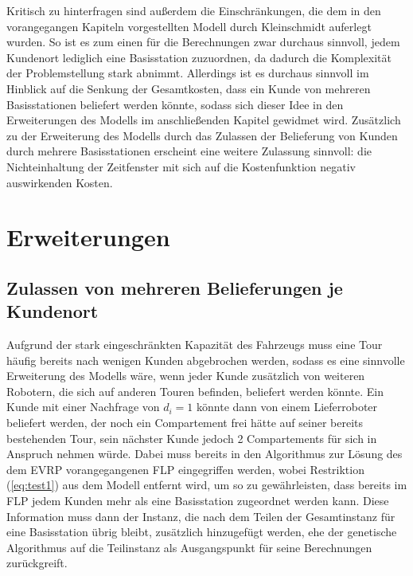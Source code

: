 \documentclass[a4paper,12pt,parskip,bibtotoc,liststotoc]{article}
\begin{document}
Kritisch zu hinterfragen sind außerdem die Einschränkungen, die dem in den vorangegangen Kapiteln vorgestellten Modell durch Kleinschmidt auferlegt wurden. 
So ist es zum einen für die Berechnungen zwar durchaus sinnvoll, jedem Kundenort lediglich eine Basisstation zuzuordnen, da dadurch die Komplexität der Problemstellung stark abnimmt. 
Allerdings ist es durchaus sinnvoll im Hinblick auf die Senkung der Gesamtkosten, dass ein Kunde von mehreren Basisstationen beliefert werden könnte, sodass sich dieser Idee in den Erweiterungen des Modells im anschließenden Kapitel gewidmet wird.
Zusätzlich zu der Erweiterung des Modells durch das Zulassen der Belieferung von Kunden durch mehrere Basisstationen erscheint eine weitere Zulassung sinnvoll: die Nichteinhaltung der Zeitfenster mit sich auf die Kostenfunktion negativ auswirkenden Kosten.


\newpage

\section{Erweiterungen}

\subsection{Zulassen von mehreren Belieferungen je Kundenort}

Aufgrund der stark eingeschränkten Kapazität des Fahrzeugs muss eine Tour häufig bereits nach wenigen Kunden abgebrochen werden, sodass es eine sinnvolle Erweiterung des Modells wäre, wenn jeder Kunde zusätzlich von weiteren Robotern, die sich auf anderen Touren befinden, beliefert werden könnte.
Ein Kunde mit einer Nachfrage von $d_{i} = 1$ könnte dann von einem Lieferroboter beliefert werden, der noch ein Compartement frei hätte auf seiner bereits bestehenden Tour, sein nächster Kunde jedoch 2 Compartements für sich in Anspruch nehmen würde.
Dabei muss bereits in den Algorithmus zur Lösung des dem EVRP vorangegangenen  FLP eingegriffen werden, wobei Restriktion (\ref{eq:test1}) aus dem Modell entfernt wird, um so zu gewährleisten, dass bereits im FLP jedem Kunden mehr als eine Basisstation zugeordnet werden kann.
Diese Information muss dann der Instanz, die nach dem Teilen der Gesamtinstanz für eine Basisstation übrig bleibt, zusätzlich hinzugefügt werden, ehe der genetische Algorithmus auf die Teilinstanz als Ausgangspunkt für seine Berechnungen zurückgreift.
\end{document}
